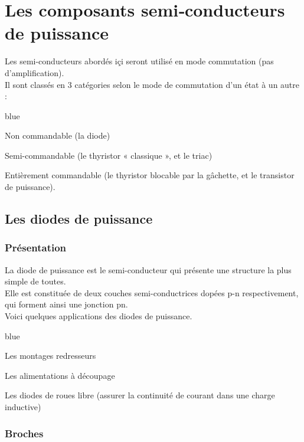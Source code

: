 \chapter{Les composants semi‐conducteurs de puissance}

Les semi-conducteurs abordés içi seront utilisé en mode commutation (pas d'amplification).\\

Il sont classés en 3 catégories selon le mode de commutation d’un état à un autre : 


\begin{items}{blue}{\Triangle}
    \item Non commandable (la diode)
    \item Semi-commandable (le thyristor « classique », et le triac)
    \item Entièrement commandable (le thyristor blocable par la gâchette, et le transistor de
    puissance).
\end{items}

\section{Les diodes de puissance}

\subsection{Présentation}

La diode de puissance est le semi-conducteur qui présente une structure la plus simple
de toutes. \\
Elle est constituée de deux couches semi-conductrices dopées p-n
respectivement, qui forment ainsi une jonction pn. \\
Voici quelques applications des diodes de puissance.

\begin{items}{blue}{\Triangle}
    \item Les montages redresseurs
    \item Les alimentations à découpage
    \item Les diodes de roues libre (assurer la continuité de courant dans une charge inductive)
\end{items}

\subsection{Broches}

